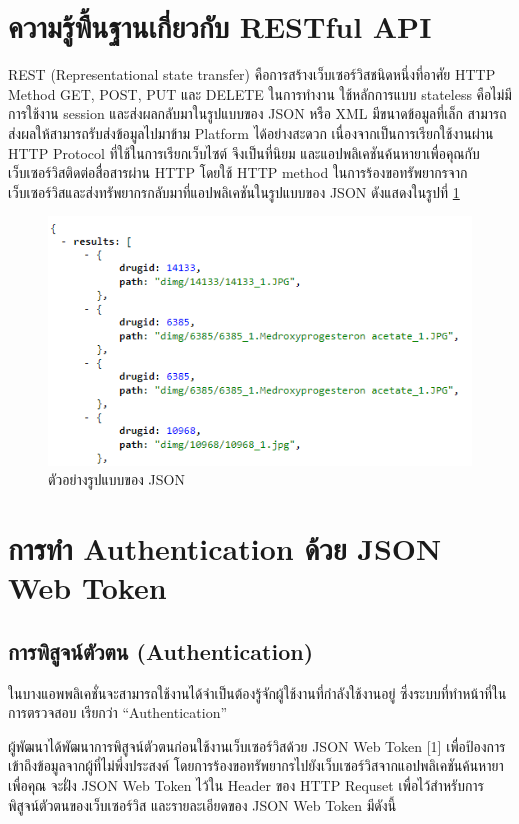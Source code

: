 \section{ความรู้พื้นฐานเกี่ยวกับ RESTful API}
	REST (Representational state transfer) คือการสร้างเว็บเซอร์วิสชนิดหนึ่งที่อาศัย HTTP Method GET, POST, PUT และ DELETE ในการทำงาน ใช้หลักการแบบ stateless คือไม่มีการใช้งาน session และส่งผลกลับมาในรูปแบบของ JSON หรือ XML มีขนาดข้อมูลที่เล็ก สามารถส่งผลให้สามารถรับส่งข้อมูลไปมาข้าม Platform ได้อย่างสะดวก เนื่องจากเป็นการเรียกใช้งานผ่าน HTTP Protocol ที่ใช้ในการเรียกเว็บไซต์ จึงเป็นที่นิยม และแอปพลิเคชันค้นหายาเพื่อคุณกับเว็บเซอร์วิสติดต่อสื่อสารผ่าน HTTP โดยใช้ HTTP method ในการร้องขอทรัพยากรจากเว็บเซอร์วิสและส่งทรัพยากรกลับมาที่แอปพลิเคชันในรูปแบบของ JSON ดังแสดงในรูปที่ 
	\ref{fig:format-JSON}  

	\begin{figure}
		\includegraphics[width=\columnwidth]{Figures/2/format-JSON}
		\caption{ตัวอย่างรูปแบบของ JSON}
		\label{fig:format-JSON}
	\end{figure}

\section{การทำ Authentication ด้วย JSON Web Token }
	\subsection{การพิสูจน์ตัวตน (Authentication)}
		ในบางแอพพลิเคชั่นจะสามารถใช้งานได้จำเป็นต้องรู้จักผู้ใช้งานที่กำลังใช้งานอยู่ ซึ่งระบบที่ทำหน้าที่ในการตรวจสอบ เรียกว่า “Authentication” 
	
		ผู้พัฒนาได้พัฒนาการพิสูจน์ตัวตนก่อนใช้งานเว็บเซอร์วิสด้วย JSON Web Token [1] เพื่อป้องการเข้าถึงข้อมูลจากผู้ที่ไม่พึ่งประสงค์ โดยการร้องขอทรัพยากรไปยังเว็บเซอร์วิสจากแอปพลิเคชันค้นหายาเพื่อคุณ จะฝั่ง JSON Web Token ไว้ใน Header ของ HTTP Requset เพื่อไว้สำหรับการพิสูจน์ตัวตนของเว็บเซอร์วิส และรายละเอียดของ JSON Web Token มีดังนี้ 
	
